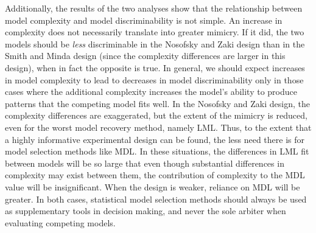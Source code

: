 \documentclass[11pt]{article}
\begin{document}
Additionally, the results of the two analyses show that the relationship between model complexity
and model discriminability is not simple. An increase in complexity does not necessarily translate
into greater mimicry. If it did, the two models should be {\it less} discriminable in the Nosofsky
and Zaki design than in the Smith and Minda design (since the complexity differences are larger in
this design), when in fact the opposite is true. In general, we should expect increases in
model complexity to lead to decreases in model discriminability only in those cases where the
additional complexity increases the model's ability to produce patterns that the competing model
fits well. In the Nosofsky and Zaki design, the complexity differences are exaggerated, but the
extent of the mimicry is reduced, even for the worst model recovery method, namely LML. Thus, to
the extent that a highly informative experimental design can be found, the less need there is for
model selection methods like MDL. In these situations, the differences in LML fit between models
will be so large that even though substantial differences in complexity may exist between them,
the contribution of complexity to the MDL value will be insignificant. When the design is weaker,
reliance on MDL will be greater. In both cases, statistical model selection methods should always
be used as supplementary tools in decision making, and never the sole arbiter when evaluating
competing models.



\newpage
\end{document}
